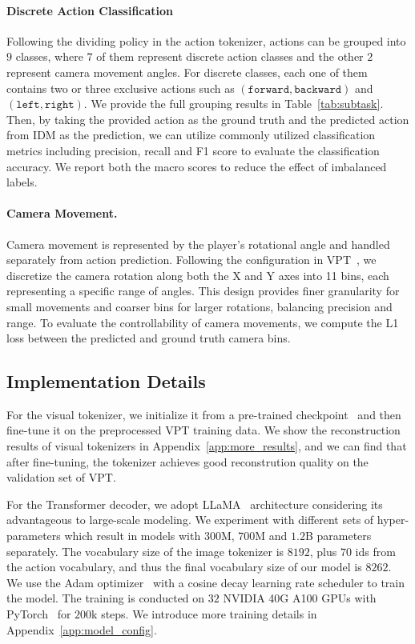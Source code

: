 \documentclass{article} %
\begin{document}
\paragraph{Discrete Action Classification} 
Following the dividing policy in the action tokenizer, actions can be grouped into $9$ classes, where $7$ of them represent discrete action classes and the other $2$ represent camera movement angles. 
For discrete classes, each one of them contains two or three exclusive actions such as $(\texttt{forward}, \texttt{backward})$ and $(\texttt{left}, \texttt{right})$. We provide the full grouping results in Table~\ref{tab:subtask}. Then, by taking the provided action as the ground truth and the predicted action from IDM as the prediction, we can utilize commonly utilized classification metrics including precision, recall and F1 score to evaluate the classification accuracy. We report both the macro scores to reduce the effect of imbalanced labels.

\paragraph{Camera Movement.} 
Camera movement is represented by the player's rotational angle and handled separately from action prediction. Following the configuration in VPT~\citep{baker2022video}, we discretize the camera rotation along both the X and Y axes into 11 bins, each representing a specific range of angles. This design provides finer granularity for small movements and coarser bins for larger rotations, balancing precision and range. To evaluate the controllability of camera movements, we compute the L1 loss between the predicted and ground truth camera bins.

\subsection{Implementation Details}

For the visual tokenizer, we initialize it from a pre-trained checkpoint~\citep{patil2024amused} and then fine-tune it on the preprocessed VPT training data. We show the reconstruction results of visual tokenizers in Appendix~\ref{app:more_results}, and we can find that after fine-tuning, the tokenizer achieves good reconstrution quality on the validation set of VPT. 

For the Transformer decoder, we adopt LLaMA~\citep{touvron2023llama} architecture considering its advantageous to large-scale modeling. We experiment with different sets of hyper-parameters which result in models with $300$M, $700$M and $1.2$B parameters separately. 
The vocabulary size of the image tokenizer is $8192$, plus $70$ ids from the action vocabulary, and thus the final vocabulary size of our model is $8262$.
We use the Adam optimizer~\citep{kingma2014adam} with a cosine decay learning rate scheduler to train the model. The training is conducted on $32$ NVIDIA 40G A100 GPUs with PyTorch~\citep{paszke2019pytorch} for $200$k steps.
We introduce more training details in Appendix~\ref{app:model_config}.
\end{document}
